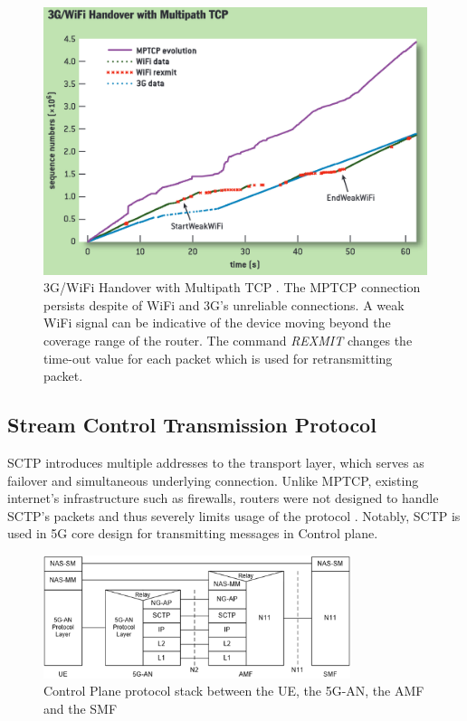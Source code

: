 \begin{figure}[H]
	\centering
	\includegraphics[width=1.0\textwidth]{resources/images/3G_WiFi_Handover_with_Multipath_TCP.PNG}
	\caption{3G/WiFi Handover with Multipath TCP \cite{paasch_multipath_2014}. The MPTCP connection persists despite of WiFi and 3G's unreliable connections. A weak WiFi signal can be indicative of the device moving beyond the coverage range of the router. The command \textit{REXMIT} changes the time-out value for each packet which is used for retransmitting packet.}
    \label{fig:related_work:3G_WiFi_Handover_with_Multipath_TCP}
\end{figure}

\subsection{Stream Control Transmission Protocol}\label{sec:related_work:mp_connection:SCTP}
\ac{SCTP} introduces multiple addresses to the transport layer, which serves as failover and simultaneous underlying connection.
Unlike \ac{MPTCP}, existing internet's infrastructure such as firewalls, routers were not designed to handle \ac{SCTP}'s packets and thus severely limits usage of the protocol \cite{paasch_multipath_2014}. 
Notably, \ac{SCTP} is used in 5G core design for transmitting messages in Control plane.

\begin{figure}[H]
	\centering
	\includegraphics[width=0.8\textwidth]{resources/images/3gpp_5g_part_of_control_plane_protocol.png}
	\caption{Control Plane protocol stack between the UE, the 5G-AN, the AMF and the SMF \cite{3gpp_5g_system_overview}}
    \label{fig:related_work:3gpp_5g_part_of_control_plane_protocol}
\end{figure}


